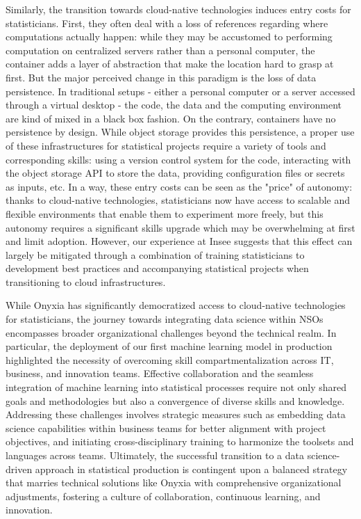 Similarly, the transition towards cloud-native technologies induces entry costs for statisticians. First, they often deal with a loss of references regarding where computations actually happen: while they may be accustomed to performing computation on centralized servers rather than a personal computer, the container adds a layer of abstraction that make the location hard to grasp at first. But the major perceived change in this paradigm is the loss of data persistence. In traditional setups - either a personal computer or a server accessed through a virtual desktop - the code, the data and the computing environment are kind of mixed in a black box fashion. On the contrary, containers have no persistence by design. While object storage provides this persistence, a proper use of these infrastructures for statistical projects require a variety of tools and corresponding skills: using a version control system for the code, interacting with the object storage API to store the data, providing configuration files or secrets as inputs, etc. In a way, these entry costs can be seen as the "price" of autonomy: thanks to cloud-native technologies, statisticians now have access to scalable and flexible environments that enable them to experiment more freely, but this autonomy requires a significant skills upgrade which may be overwhelming at first and limit adoption. However, our experience at Insee suggests that this effect can largely be mitigated through a combination of training statisticians to development best practices and accompanying statistical projects when transitioning to cloud infrastructures.

While Onyxia has significantly democratized access to cloud-native technologies for statisticians, the journey towards integrating data science within NSOs encompasses broader organizational challenges beyond the technical realm. In particular, the deployment of our first machine learning model in production highlighted the necessity of overcoming skill compartmentalization across IT, business, and innovation teams. Effective collaboration and the seamless integration of machine learning into statistical processes require not only shared goals and methodologies but also a convergence of diverse skills and knowledge. Addressing these challenges involves strategic measures such as embedding data science capabilities within business teams for better alignment with project objectives, and initiating cross-disciplinary training to harmonize the toolsets and languages across teams. Ultimately, the successful transition to a data science-driven approach in statistical production is contingent upon a balanced strategy that marries technical solutions like Onyxia with comprehensive organizational adjustments, fostering a culture of collaboration, continuous learning, and innovation.
